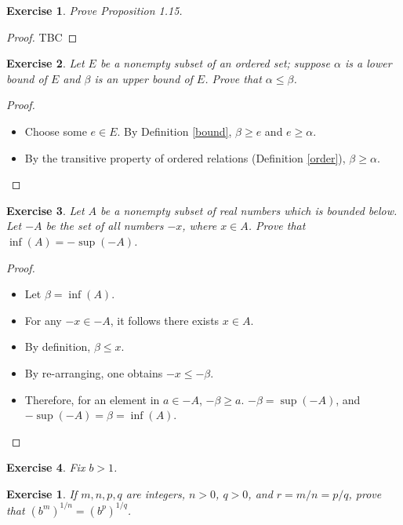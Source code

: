 \documentclass[12pt]{article}
\newtheorem{exercise}{Exercise}[section]
\newtheorem{subexercise}{Exercise}[exercise]
\begin{document}
\begin{exercise}
    Prove Proposition 1.15.
\end{exercise}

\begin{proof}
    TBC
\end{proof}

\begin{exercise}
    Let $E$ be a nonempty subset of an ordered set; suppose $\alpha$ is a lower bound of $E$ and $\beta$ is an upper bound of $E$. Prove that $\alpha \leq \beta$.
\end{exercise}

\begin{proof}
    \begin{itemize}
        \item Choose some $e \in E$. By Definition \ref{bound}, $\beta \geq e$ and $e \geq \alpha$.
        \item By the transitive property of ordered relations (Definition \ref{order}), $\beta \geq \alpha$.
    \end{itemize}
\end{proof}

\begin{exercise}
    Let $A$ be a nonempty subset of real numbers which is bounded below. Let $-A$ be the set of all numbers $-x$, where $x \in A$. Prove that $\inf(A) = -\sup(-A)$.
\end{exercise}

\begin{proof}
    \begin{itemize}
        \item Let $\beta = \inf(A)$.
        \item For any $-x \in -A$, it follows there exists $x \in A$.
        \item By definition, $\beta \leq x$.
        \item By re-arranging, one obtains $-x \leq -\beta$.
        \item Therefore, for an element in $a \in -A$, $-\beta \geq a$. $-\beta = \sup(-A)$, and $-\sup(-A) = \beta = \inf(A)$.
    \end{itemize}
\end{proof}

\begin{exercise}
    Fix $b > 1$.
\end{exercise}

\begin{subexercise}
    If $m, n, p, q$ are integers, $n>0$, $q>0$, and $r = m/n = p/q$, prove that $(b^m)^{1/n} = (b^p)^{1/q}$.
\end{subexercise}
\end{document}
